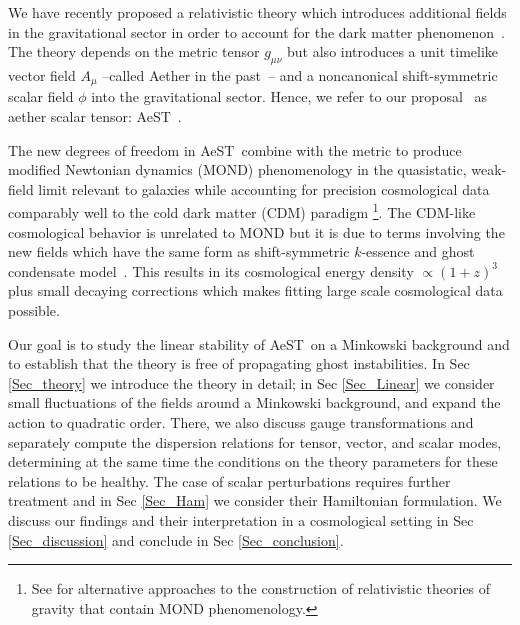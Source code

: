 \documentclass[twocolumn,prd,preprintnumbers,amsmath,amssymb,nofootinbib,superscriptaddress]{revtex4-1}
\newcommand{\AeST}{AeST~}
\begin{document}
We have recently proposed a relativistic theory which introduces additional fields in the gravitational sector
in order to account for the dark matter phenomenon~\cite{Skordis:2020eui}.
The theory depends on the metric tensor $g_{\mu\nu}$ but also introduces a unit timelike vector field $A_{\mu}$ --called Aether in the past~\cite{Jacobson:2000xp}--
 and a noncanonical shift-symmetric scalar field $\phi$ into the gravitational sector.
Hence, we refer to our proposal~\cite{Skordis:2020eui} as aether scalar tensor: \AeST.

 The new degrees of freedom in \AeST combine with the metric to produce modified Newtonian dynamics (MOND) phenomenology \cite{Milgrom1983a,BekensteinMilgrom1984} 
in the quasistatic, weak-field limit relevant to galaxies while accounting 
for precision cosmological data \cite{Planck:2018vyg} comparably well to the cold dark matter (CDM) 
paradigm \footnote{See \cite{Bekenstein1988,Sanders1997,Bekenstein2004,Sanders2005,NavarroVanAcoleyen2005,ZlosnikFerreiraStarkman2006,Sanders2007,Milgrom2009,BabichevDeffayetEsposito-Farese2011,DeffayetEsposito-FareseWoodard2011,Woodard2014,Khoury2014,Blanchet:2015sra,Hossenfelder2017,Burrage:2018zuj,Milgrom:2019rtd,DAmbrosio:2020nev} for alternative approaches to the construction of relativistic theories of gravity that contain MOND phenomenology.}.
The CDM-like cosmological behavior is unrelated to MOND but it is due to terms involving the new fields which have 
the same form as shift-symmetric $k$-essence and ghost condensate model~\citep{Scherrer2004,ArkaniHamedEtAl2003}.
This results in its cosmological energy density $\propto (1+z)^{3}$ plus small decaying corrections which makes
fitting large scale cosmological data possible.

Our goal is to study the linear stability of \AeST on a Minkowski background and to establish that
the theory is free of propagating ghost instabilities.
 In Sec \ref{Sec_theory} we introduce the theory in detail; in Sec \ref{Sec_Linear} we consider small fluctuations of the fields around a Minkowski background,
and expand the action to quadratic order. There, we also discuss gauge transformations and separately compute the dispersion relations
for tensor, vector, and scalar modes, determining at the same time the conditions on the theory parameters for these relations to be healthy.
 The case of scalar perturbations requires further treatment and in Sec \ref{Sec_Ham} we consider their Hamiltonian formulation.
We discuss our findings and their interpretation  in a cosmological setting in Sec \ref{Sec_discussion} and conclude in Sec \ref{Sec_conclusion}.
\end{document}
